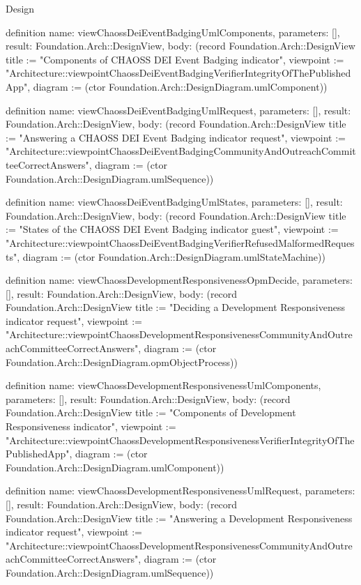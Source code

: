 \begin{lexlean}{Design}
\begin{semanticmodule}
definition{
  name: viewChaossDeiEventBadgingUmlComponents,
  parameters: [],
  result: Foundation.Arch::DesignView,
  body: (record Foundation.Arch::DesignView {title := "Components of CHAOSS DEI Event Badging indicator", viewpoint := "Architecture::viewpointChaossDeiEventBadgingVerifierIntegrityOfThePublishedApp", diagram := (ctor Foundation.Arch::DesignDiagram.umlComponent)})
}

definition{
  name: viewChaossDeiEventBadgingUmlRequest,
  parameters: [],
  result: Foundation.Arch::DesignView,
  body: (record Foundation.Arch::DesignView {title := "Answering a CHAOSS DEI Event Badging indicator request", viewpoint := "Architecture::viewpointChaossDeiEventBadgingCommunityAndOutreachCommitteeCorrectAnswers", diagram := (ctor Foundation.Arch::DesignDiagram.umlSequence)})
}

definition{
  name: viewChaossDeiEventBadgingUmlStates,
  parameters: [],
  result: Foundation.Arch::DesignView,
  body: (record Foundation.Arch::DesignView {title := "States of the CHAOSS DEI Event Badging indicator guest", viewpoint := "Architecture::viewpointChaossDeiEventBadgingVerifierRefusedMalformedRequests", diagram := (ctor Foundation.Arch::DesignDiagram.umlStateMachine)})
}

definition{
  name: viewChaossDevelopmentResponsivenessOpmDecide,
  parameters: [],
  result: Foundation.Arch::DesignView,
  body: (record Foundation.Arch::DesignView {title := "Deciding a Development Responsiveness indicator request", viewpoint := "Architecture::viewpointChaossDevelopmentResponsivenessCommunityAndOutreachCommitteeCorrectAnswers", diagram := (ctor Foundation.Arch::DesignDiagram.opmObjectProcess)})
}

definition{
  name: viewChaossDevelopmentResponsivenessUmlComponents,
  parameters: [],
  result: Foundation.Arch::DesignView,
  body: (record Foundation.Arch::DesignView {title := "Components of Development Responsiveness indicator", viewpoint := "Architecture::viewpointChaossDevelopmentResponsivenessVerifierIntegrityOfThePublishedApp", diagram := (ctor Foundation.Arch::DesignDiagram.umlComponent)})
}

definition{
  name: viewChaossDevelopmentResponsivenessUmlRequest,
  parameters: [],
  result: Foundation.Arch::DesignView,
  body: (record Foundation.Arch::DesignView {title := "Answering a Development Responsiveness indicator request", viewpoint := "Architecture::viewpointChaossDevelopmentResponsivenessCommunityAndOutreachCommitteeCorrectAnswers", diagram := (ctor Foundation.Arch::DesignDiagram.umlSequence)})
}


\end{semanticmodule}
\end{lexlean}
